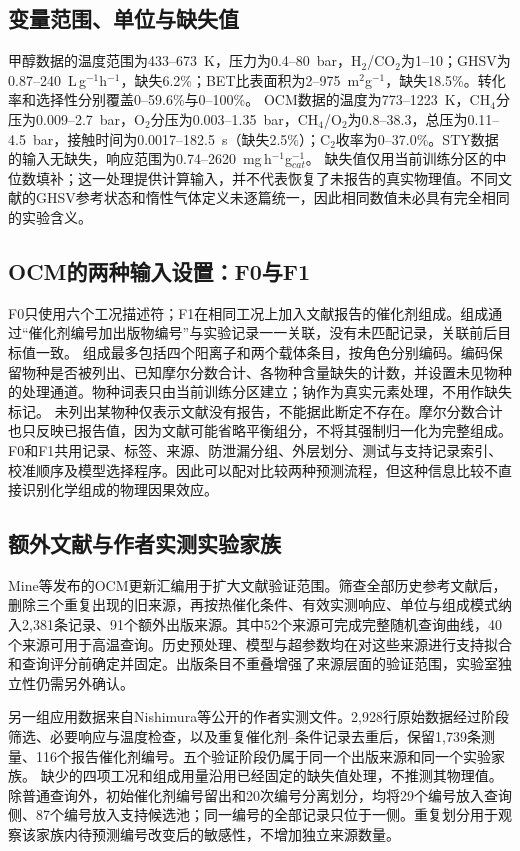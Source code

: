 \documentclass[11pt,a4paper]{article}
\begin{document}
\subsection{变量范围、单位与缺失值}
甲醇数据的温度范围为433--673~K，压力为0.4--80~bar，H$_2$/CO$_2$为1--10；GHSV为0.87--240~L\,g$^{-1}$h$^{-1}$，缺失6.2\%；BET比表面积为2--975~m$^2$g$^{-1}$，缺失18.5\%。转化率和选择性分别覆盖0--59.6\%与0--100\%。
OCM数据的温度为773--1223~K，CH$_4$分压为0.009--2.7~bar，O$_2$分压为0.003--1.35~bar，CH$_4$/O$_2$为0.8--38.3，总压为0.11--4.5~bar，接触时间为0.0017--182.5~s（缺失2.5\%）；C$_2$收率为0--37.0\%。STY数据的输入无缺失，响应范围为0.74--2620~mg\,h$^{-1}$g$_{cat}^{-1}$。
缺失值仅用当前训练分区的中位数填补；这一处理提供计算输入，并不代表恢复了未报告的真实物理值。不同文献的GHSV参考状态和惰性气体定义未逐篇统一，因此相同数值未必具有完全相同的实验含义。

\subsection{OCM的两种输入设置：F0与F1}
F0只使用六个工况描述符；F1在相同工况上加入文献报告的催化剂组成。组成通过“催化剂编号加出版物编号”与实验记录一一关联，没有未匹配记录，关联前后目标值一致。
组成最多包括四个阳离子和两个载体条目，按角色分别编码。编码保留物种是否被列出、已知摩尔分数合计、各物种含量缺失的计数，并设置未见物种的处理通道。物种词表只由当前训练分区建立；钠作为真实元素处理，不用作缺失标记。
未列出某物种仅表示文献没有报告，不能据此断定不存在。摩尔分数合计也只反映已报告值，因为文献可能省略平衡组分，不将其强制归一化为完整组成。
F0和F1共用记录、标签、来源、防泄漏分组、外层划分、测试与支持记录索引、校准顺序及模型选择程序。因此可以配对比较两种预测流程，但这种信息比较不直接识别化学组成的物理因果效应。

\subsection{额外文献与作者实测实验家族}
Mine等发布的OCM更新汇编\cite{mine}用于扩大文献验证范围。筛查全部历史参考文献后，删除三个重复出现的旧来源，再按热催化条件、有效实测响应、单位与组成模式纳入2,381条记录、91个额外出版来源。其中52个来源可完成完整随机查询曲线，40个来源可用于高温查询。历史预处理、模型与超参数均在对这些来源进行支持拟合和查询评分前确定并固定。出版条目不重叠增强了来源层面的验证范围，实验室独立性仍需另外确认。

另一组应用数据来自Nishimura等公开的作者实测文件\cite{nishimura2023new}。2,928行原始数据经过阶段筛选、必要响应与温度检查，以及重复催化剂--条件记录去重后，保留1,739条测量、116个报告催化剂编号。五个验证阶段仍属于同一个出版来源和同一个实验家族。
缺少的四项工况和组成用量沿用已经固定的缺失值处理，不推测其物理值。除普通查询外，初始催化剂编号留出和20次编号分离划分，均将29个编号放入查询侧、87个编号放入支持候选池；同一编号的全部记录只位于一侧。重复划分用于观察该家族内待预测编号改变后的敏感性，不增加独立来源数量。
\end{document}
